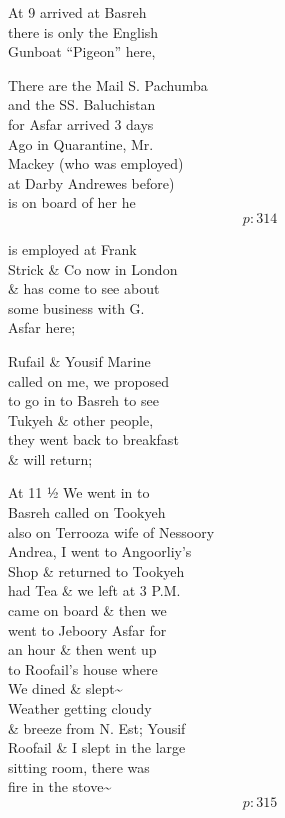 \documentclass{report}
\begin{document}
	\par{
 	At 9 arrived at Basreh\ \\there is only the English\ \\Gunboat “Pigeon” here,\ \\
	}

	\par{
 	There are the Mail S. Pachumba\ \\and the SS. Baluchistan\ \\for Asfar arrived 3 days\ \\Ago in Quarantine, Mr.\ \\Mackey (who was employed)\ \\at Darby Andrewes before)\ \\is on board of her he\ \\
  \[p: 314 \]

	}

	\par{
 	is employed at Frank\ \\Strick \& Co now in London\ \\\& has come to see about\ \\some business with G.\ \\Asfar here;\ \\
	}

	\par{
 	Rufail \& Yousif Marine\ \\called on me, we proposed\ \\to go in to Basreh to see\ \\Tukyeh \& other people,\ \\they went back to breakfast\ \\\& will return;\ \\
	}

	\par{
 	At 11 ½ We went in to\ \\Basreh called on Tookyeh\ \\also on Terrooza wife of Nessoory\ \\Andrea, I went to Angoorliy’s\ \\Shop \& returned to Tookyeh\ \\had Tea \& we left at 3 P.M.\ \\came on board \& then we\ \\went to Jeboory Asfar for\ \\an hour \& then went up\ \\to Roofail’s house where\ \\We dined \& slept\~{}\ \\Weather getting cloudy\ \\\& breeze from N. Est; Yousif\ \\Roofail \& I slept in the large\ \\sitting room, there was\ \\fire in the stove\~{}\ \\
  \[p: 315 \]

	}
\end{document}
